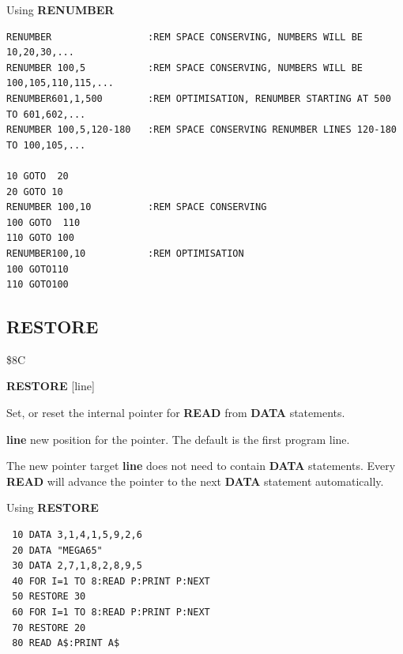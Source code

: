 \begin{description}[leftmargin=2cm,style=nextline]
\item [Examples:] Using {\bf RENUMBER}
\begin{tcolorbox}[colback=black,coltext=white]
\verbatimfont{\codefont}
\begin{verbatim}
RENUMBER                 :REM SPACE CONSERVING, NUMBERS WILL BE 10,20,30,...
RENUMBER 100,5           :REM SPACE CONSERVING, NUMBERS WILL BE 100,105,110,115,...
RENUMBER601,1,500        :REM OPTIMISATION, RENUMBER STARTING AT 500 TO 601,602,...
RENUMBER 100,5,120-180   :REM SPACE CONSERVING RENUMBER LINES 120-180 TO 100,105,...

10 GOTO  20
20 GOTO 10
RENUMBER 100,10          :REM SPACE CONSERVING
100 GOTO  110
110 GOTO 100
RENUMBER100,10           :REM OPTIMISATION
100 GOTO110
110 GOTO100
\end{verbatim}
\end{tcolorbox}
\end{description}


\newpage
\subsection{RESTORE}
\begin{description}[leftmargin=2cm,style=nextline]
\item [Token:] \$8C
\item [Format:] {\bf RESTORE} [line]
\item [Usage:]  Set, or reset the internal pointer for
                {\bf READ} from {\bf DATA} statements.

                {\bf line} new position for the
                pointer. The default is the
                first program line.

\item [Remarks:] The new pointer target {\bf line}
                 does not need to contain {\bf DATA} statements.
                 Every {\bf READ} will advance
                 the pointer to the next {\bf DATA} statement automatically.
\item [Example:] Using {\bf RESTORE}

\begin{tcolorbox}[colback=black,coltext=white]
\verbatimfont{\codefont}
\begin{verbatim}
 10 DATA 3,1,4,1,5,9,2,6
 20 DATA "MEGA65"
 30 DATA 2,7,1,8,2,8,9,5
 40 FOR I=1 TO 8:READ P:PRINT P:NEXT
 50 RESTORE 30
 60 FOR I=1 TO 8:READ P:PRINT P:NEXT
 70 RESTORE 20
 80 READ A$:PRINT A$
\end{verbatim}
\end{tcolorbox}
\end{description}

